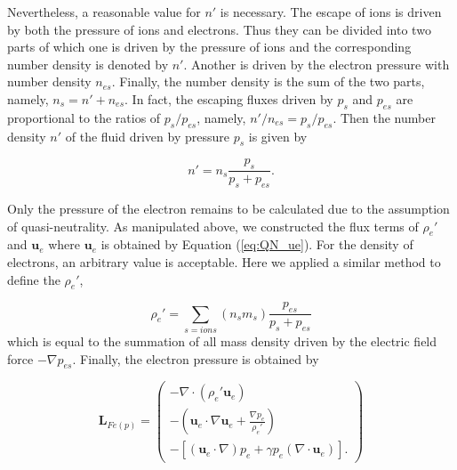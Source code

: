 \documentclass[journal, onecolumn]{aastex631}
\begin{document}
\begin{CJK*}{UTF8}{gbsn}
Nevertheless, a reasonable value for $n'$ is necessary. The escape of ions is driven by both the pressure of ions and electrons. Thus they can be divided into two parts of which one is driven by the pressure of ions and the corresponding number density is denoted by $n'$. Another is driven by the electron pressure with number density $n_{es}$. Finally, the number density is the sum of the two parts, namely, $n_s =n'+n_{es}$. In fact, the escaping fluxes driven by $p_s$ and $p_{es}$ are proportional to the ratios of $p_{s}/p_{es}$, namely, $n'/n_{es}=p_{s}/p_{es}$. Then the number density $n'$ of the fluid driven by pressure $p_s$ is given by



\begin{equation}\label{eq:c_match}
n' = n_ {s}\frac{p_{s}}{p_ {s}+p_{es}}.
\end{equation}

Only the pressure of the electron remains to be calculated due to the assumption of quasi-neutrality. As manipulated above, we constructed the flux terms of $\rho_{e}'$ and $\textbf{u}_e$ where $\textbf{u}_{e}$ is obtained by Equation (\ref{eq:QN_ue}). For the density of electrons, an arbitrary value is acceptable. Here we applied a similar method to define the $\rho_{e}'$,

\begin{equation}\label{eq:c_e_mt}
\rho_{e}' = \sum_{s=ions}(n_{s}m_{s})\frac{p_{es}}{p_ {s}+p_{es}}
\end{equation}
which is equal to the summation of all mass density driven by the electric field force $-\nabla p_{es}$. Finally, the electron pressure is obtained by

\begin{equation}\label{eq:F_e_p}
\textbf{L}_{Fe(p)}=
\begin{pmatrix}
-\nabla\cdot(\rho_e'\textbf{u}_{e})\\
-(\textbf{u}_{e}\cdot\nabla\textbf{u}_{e}+\frac{\nabla p_{e}}{\rho_e'})\\
-[(\textbf{u}_{e}\cdot\nabla)p_{e}+\gamma p_{e}(\nabla\cdot\textbf{u}_{e})].                                                                                                                                                                                                                                                                                                                                                                                      
\end{pmatrix}
\end{equation}


\end{CJK*}
\end{document}
